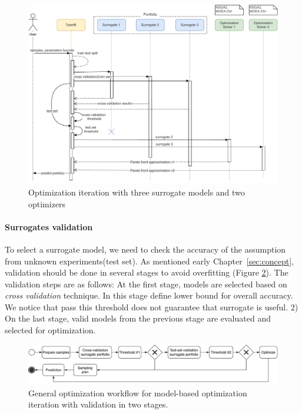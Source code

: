         \begin{figure}[h]
            \centering
            \includegraphics[width=\textwidth]{content/images/portfolio_validation_solv}
            \caption[Portfolio validation activity]{Optimization iteration with three surrogate models and two optimizers}
            \label{fig:tutor_activity}
        \end{figure}

    \paragraph{Surrogates validation}
        To select a surrogate model, we need to check the accuracy of the assumption from unknown experiments(test set). As mentioned early Chapter~\ref{sec:concept}, validation should be done in several stages to avoid overfitting (Figure \ref{fig:simsim_activity_validation}). The validation steps are as follows: At the first stage, models are selected based on \emph{cross validation} technique. In this stage define lower bound for overall accuracy. We notice that pass this threshold does not guarantee that surrogate is useful. 2) On the last stage, valid models from the previous stage are evaluated and selected for optimization.

            \begin{figure}
                \centering
                \includegraphics[width=\textwidth]{content/images/simsim_activity_workflow}
                \caption[General workflow activity]{General optimization workflow for model-based optimization iteration with validation in two stages.}
                \label{fig:simsim_activity_validation}
            \end{figure}

